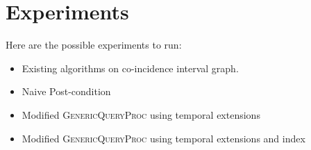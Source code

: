 \clearpage
\section{Experiments}

Here are the possible experiments to run:
\begin{itemize}
  \item Existing algorithms on co-incidence interval graph.
  \item Naive Post-condition
  \item Modified \textsc{GenericQueryProc} using temporal extensions
  \item Modified \textsc{GenericQueryProc} using temporal extensions and index

\end{itemize}
